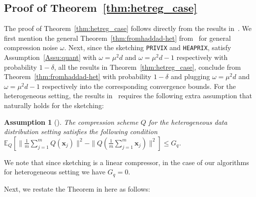 \documentclass[twoside]{article}
\newtheorem{assumption}{Assumption}
\begin{document}


\subsection{Proof of Theorem~\ref{thm:hetreg_case}}
The proof of Theorem~\ref{thm:hetreg_case} follows directly from the results in~\cite{haddadpour2020federated}. We first mention the general Theorem~\ref{thm:fromhaddad-het} from~\cite{haddadpour2020federated} for general compression noise $\omega$. Next, since the sketching \texttt{PRIVIX} and \texttt{HEAPRIX}, satisfy Assumption~\ref{Assu:quant} with $\omega=\mu^2d$ and $\omega=\mu^2d-1$ respectively with probability $1-\delta$,  all the results in Theorem~\ref{thm:hetreg_case}, conclude from Theorem~\ref{thm:fromhaddad-het} with probability $1-\delta$ and plugging $\omega=\mu^2d$ and $\omega=\mu^2d-1$ respectively into the corresponding convergence bounds. 
For the heterogeneous setting, the results in~\cite{haddadpour2020federated} requires the following extra assumption that naturally holds for the sketching: 

\begin{assumption}[\cite{haddadpour2020federated}]\label{assum:009}
The compression scheme $Q$ for the heterogeneous data distribution setting satisfies the following condition $
    \mathbb{E}_Q[\|\frac{1}{m}\sum_{j=1}^m Q(\boldsymbol{x}_j)\|^2-\|Q(\frac{1}{m}\sum_{j=1}^m \boldsymbol{x}_j)\|^2]\leq G_q$.
\end{assumption}
We note that since sketching is a linear compressor, in the case of our algorithms for heterogeneous setting we have $G_q=0$. 


Next, we restate the Theorem in \cite{haddadpour2020federated} here as follows:
\end{document}
